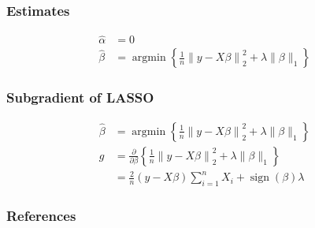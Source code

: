 \documentclass{beamer}
\DeclareMathOperator{\argmin}{argmin}
\DeclareMathOperator{\sign}{sign}
\begin{document}
\begin{frame}
\frametitle{Estimates}
\begin{equation}\label{eq:lasso alpha}
\begin{aligned}
\hat{\alpha} &= 0 \\
\hat{\beta} &= \argmin \left\{ \frac{1}{n}\left\|y-X \beta\right\|^2_2 + \lambda \|\beta\|_1 \right\}
\end{aligned}
\end{equation}
\end{frame}

\begin{frame}
\frametitle{Subgradient of LASSO}
\begin{equation}\label{eq:lasso alpha}
\begin{aligned}
\hat{\beta} &= \argmin \left\{ \frac{1}{n}\left\|y-X \beta\right\|^2_2 + \lambda \|\beta\|_1 \right\} \\
g &= \frac{\partial}{\partial \beta} \left\{ \frac{1}{n}\left\|y-X \beta\right\|^2_2 + \lambda \|\beta\|_1 \right\} \\
&= \frac{2}{n} (y - X \beta) \sum_{i=1}^n X_i + \sign (\beta) \lambda
\end{aligned}
\end{equation}
\end{frame}


\begin{frame}[allowframebreaks]
\frametitle{References}
\printbibliography
\end{frame}
\end{document}
